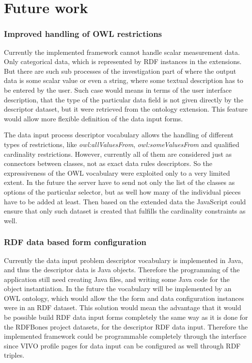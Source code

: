 \section{Future work}

\subsubsection{Improved handling of OWL restrictions}

Currently the implemented framework cannot handle scalar measurement data. Only categorical data, which is represented by RDF instances in the extensions. But there are such sub processes of the investigation part of where the output data is some scalar value or even a string, where some textual description has to be entered by the user. Such case would means in terms of the user interface description, that the type of the particular data field is not given directly by the descriptor dataset, but it were retrieved from the ontology extension. This feature would allow more flexible definition of the data input forms.

The data input process descriptor vocabulary allows the handling of different types of restrictions, like \textit{owl:allValuesFrom}, \textit{owl:someValuesFrom} and qualified cardinality restrictions. However, currently all of them are considered just as connectors between classes, not as exact data rules descriptors. So the expressiveness of the OWL vocabulary were exploited only to a very limited extent. In the future the server have to send not only the list of the classes as options of the particular selector, but as well how many of the individual pieces have to be added at least. Then based on the extended data the JavaScript could ensure that only such dataset is created that fulfills the cardinality constraints as well.

\subsubsection{RDF data based form configuration}

Currently the data input problem descriptor vocabulary is implemented in Java, and thus the descriptor data is Java objects. Therefore the programming of the application still need creating Java files, and writing some Java code for the object instantiation. In the future the vocabulary will be implemented by an OWL ontology, which would allow the the form and data configuration instances were in an RDF dataset. This solution would mean the advantage that it would be possible build RDF data input forms completely the same way as it is done for the RDFBones project datasets, for the descriptor RDF data input. Therefore the implemented framework could be programmable completely through the interface since VIVO profile pages for data input can be configured as well through RDF triples.







